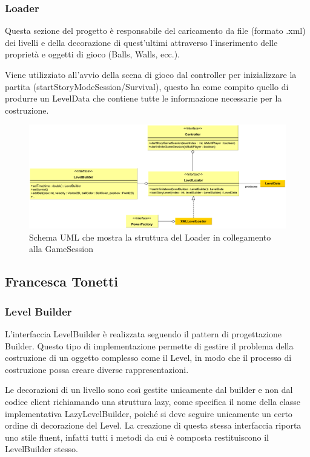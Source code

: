\documentclass[a4paper,12pt]{report}
\begin{document}
\subsubsection*{Loader}
Questa sezione del progetto è responsabile del caricamento da file (formato .xml) dei livelli e della decorazione di quest'ultimi attraverso l'inserimento delle proprietà e oggetti di gioco (Balls, Walls, ecc.).

Viene utilizziato all'avvio della scena di gioco dal controller per inizializzare la partita (startStoryModeSession/Survival), questo ha come compito quello di produrre un LevelData che contiene tutte le informazione necessarie per la costruzione.
\begin{figure}[H]
\includegraphics[width=\linewidth]{img/loader}
\caption{Schema UML che mostra la struttura del Loader in collegamento alla GameSession}
\label{img:loader}
\end{figure}


\subsection*{Francesca Tonetti}
\subsubsection*{Level Builder}
L'interfaccia LevelBuilder è realizzata seguendo il pattern di progettazione Builder.
Questo tipo di implementazione permette di gestire il problema della costruzione di un oggetto complesso come il Level, in modo che il processo di costruzione possa creare diverse rappresentazioni.

Le decorazioni di un livello sono così gestite unicamente dal builder e non dal codice client richiamando una struttura lazy, come specifica il nome della classe implementativa LazyLevelBuilder, poiché si deve seguire unicamente un certo ordine di decorazione del Level. 
La creazione di questa stessa interfaccia riporta uno stile fluent, infatti tutti i metodi da cui è composta restituiscono il LevelBuilder stesso.
\end{document}
